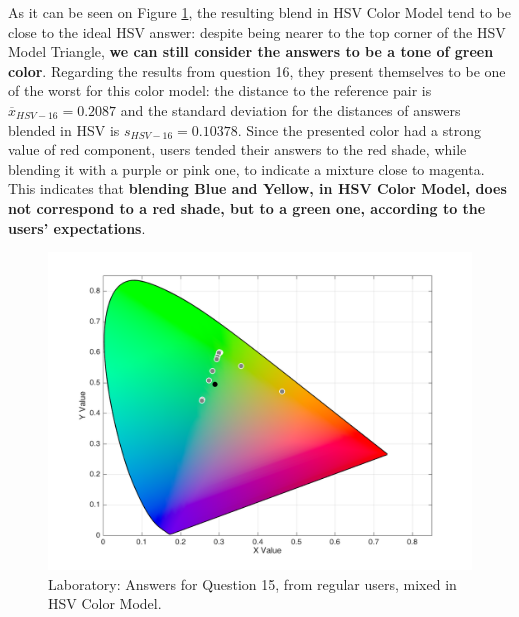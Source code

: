 \begin{enumerate}
  As it can be seen on Figure \ref{fig:labhsvregular_15}, the resulting blend in HSV Color Model tend to be close to the ideal HSV answer: despite being nearer to the top corner of the HSV Model Triangle, \textbf{we can still
  consider the answers to be a tone of green color}. Regarding the results from question 16, they present themselves to be one of the worst for this color model: the distance to the reference pair is $\overline{x}_{HSV-16} = 0.2087$
  and the standard deviation for the distances of answers blended in HSV is $s_{HSV-16} = 0.10378$. Since the presented color had a strong value of red component, users tended their answers to the red shade, while blending
  it with a purple or pink one, to indicate a mixture close to magenta. This indicates that \textbf{blending Blue and Yellow, in HSV Color Model, does not correspond to a red shade, but to a green one, according to
  the users' expectations}.
  \begin{figure}[!htbp]
    \centering
    \begin{minipage}{0.48\textwidth}
      \centering
      \includegraphics[width=\textwidth]{images/results/15_lab_HSVresponses.png}
      \caption[Laboratory: Answers for Question 15, from regular users, mixed in HSV Color Model.]{Laboratory: Answers for Question 15, from regular users, mixed in HSV Color Model.}
      \label{fig:labhsvregular_15}
    \end{minipage}\hfill
    \begin{minipage}{0.48\textwidth}
      \centering

\end{minipage}
\end{figure}
\end{enumerate}
